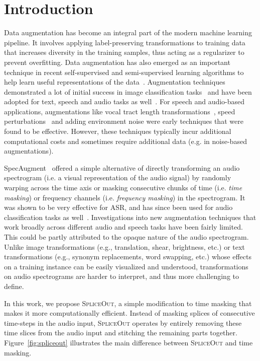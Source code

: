 \documentclass{article}
\newcommand{\SpA}{{\textsc{SpliceOut}}\xspace}
\begin{document}
\section{Introduction}
Data augmentation has become an integral part of the modern machine learning pipeline. It involves applying label-preserving transformations to training data that increases diversity in the training samples, thus acting as a regularizer to prevent overfitting. Data augmentation has also emerged as an important technique in recent self-supervised and semi-supervised learning algorithms to help learn useful representations of the data~\citep{xie2020selftraining,grill2020bootstrap,chen2020exploring,zbontar2021barlow,caron2020unsupervised,he2020momentum,chen2020simple}. Augmentation techniques demonstrated a lot of initial success in image classification tasks~\citep{perez2017effectiveness} and have been adopted for text, speech and audio tasks as well~\citep{wei-zou-2019-eda,kobayashi-2018-contextual,hou-etal-2018-sequence}. For speech and audio-based applications, augmentations like vocal tract length transformations~\citep{jaitly2013vocal}, speed perturbations~\citep{speedpertubation} and adding environment noise were early techniques that were found to be effective. However, these techniques typically incur additional computational costs and sometimes require additional data (e.g. in noise-based augmentations).

SpecAugment~\citep{specaugment} offered a simple alternative of directly transforming an audio spectrogram (i.e. a visual representation of the audio signal) by randomly warping across the time axis or masking consecutive chunks of time (i.e. \emph{time masking}) or frequency channels (i.e. \emph{frequency masking}) in the spectrogram. It was shown to be very effective for ASR, and has since been used for audio classification tasks as well~\citep{panns,urban,deepspectrumlite}. Investigations into new augmentation techniques that work broadly across different audio and speech tasks have been fairly limited. This could be partly attributed to the opaque nature of the audio spectrogram. Unlike image transformations (e.g., translation, shear, brightness, etc.) or text transformations (e.g., synonym replacements, word swapping, etc.) whose effects on a training instance can be easily visualized and understood, transformations on audio spectrograms are harder to interpret, and thus more challenging to define.

In this work, we propose \SpA, a simple modification to time masking that makes it more computationally efficient. Instead of masking splices of consecutive time-steps in the audio input, \SpA operates by entirely removing these time slices from the audio input and stitching the remaining parts together. Figure~\ref{fig:spliceout} illustrates the main difference between \SpA and time masking. 
\end{document}
